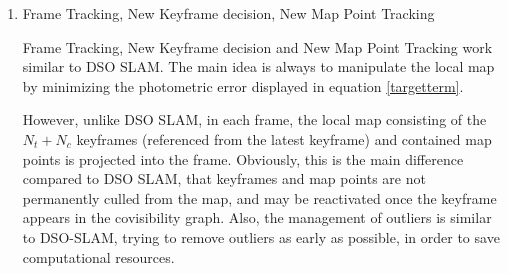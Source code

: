 \begin{enumerate}
	\item{Frame Tracking, New Keyframe decision, New Map Point Tracking}
	
	Frame Tracking, New Keyframe decision and New Map Point Tracking work similar to DSO SLAM. The main idea is always to manipulate the local map 
	by minimizing the photometric error displayed in equation \ref{targetterm}. 

	However, unlike DSO SLAM, in each frame, the local map 
	consisting of the $N_t + N_c$ keyframes (referenced from the latest keyframe) and contained map points is projected into the frame. 
	Obviously, this is the main difference compared to DSO SLAM, that keyframes and map points are not permanently culled from the 
	map, and may be reactivated once the keyframe appears in the covisibility graph. Also, the management of outliers is similar to DSO-SLAM, 
	trying to remove outliers as early as possible, in order to save computational resources. 
	\end{enumerate}
 